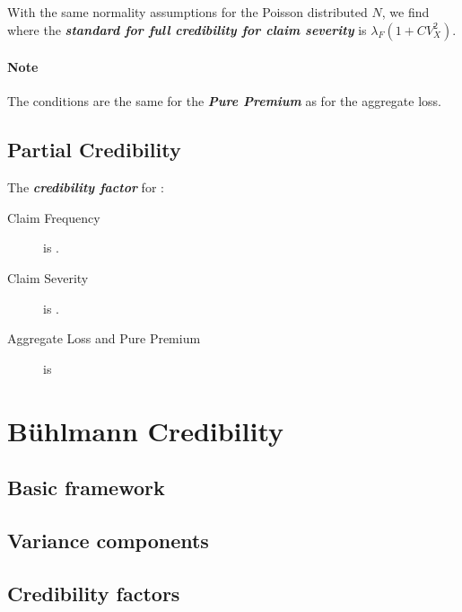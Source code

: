 \documentclass[english]{article}
\begin{document}
\begin{multicols*}{2}
\bigskip

With the same normality assumptions for the Poisson distributed $N$, we find  where the \textbf{\textit{standard for full credibility for claim severity}} is $\lambda_{F}(1 + CV_{X}^{2})$.

\paragraph{Note}	The conditions are the same for the \textit{\textbf{Pure Premium}} as for the aggregate loss.


\subsection{Partial Credibility}\label{subsec:PartialCred}
The \textbf{\textit{credibility factor}} for :
\begin{description}
	\item[Claim Frequency]	is .
	\item[Claim Severity]	is .
	\item[Aggregate Loss and Pure Premium]	is 
\end{description}


\newpage
\section{Bühlmann Credibility}\label{sec:Buhl}
\subsection{Basic framework}


\subsection{Variance components}



\subsection{Credibility factors}




\end{multicols*}
\end{document}
